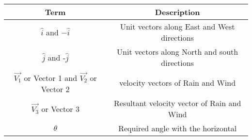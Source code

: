 \begin{tabular}[12ptx]{ |c| c|}
\hline\textbf{Term} & \textbf{Description}\\
\hline
$\hat{i}$ and $-\hat{i}$ & Unit vectors along East and West directions \\

\hline
$\hat{j}$ and -$\hat{j}$ & Unit vectors along North and south directions\\
\hline
$\vec{V_{1}}$ or Vector 1 and $\vec{V_{2}}$ or Vector 2 & velocity vectors of Rain and Wind\\
\hline
$\vec{V_{3}}$ or Vector 3 & Resultant velocity vector of Rain and Wind\\
\hline
$\theta$ & Required angle with the horizontal\\
\hline
\end{tabular}